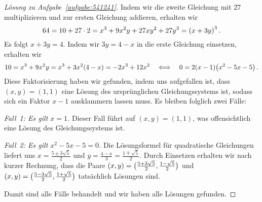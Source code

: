 \begin{proof}[Lösung zu Aufgabe~\ref{aufgabe:541241}]
	Indem wir die zweite Gleichung mit $27$ multiplizieren und zur ersten Gleichung addieren, erhalten wir
	\begin{equation*}
		64=10+27\cdot 2=x^3+9x^2y+27xy^2+27y^3=\parens*{x+3y}^3\,.
	\end{equation*}
	Es folgt $x+3y=4$. Indem wir $3y=4-x$ in die erste Gleichung einsetzen, erhalten wir
	\begin{equation*}
		10=x^3+9x^2y=x^3+3x^2(4-x)=-2x^3+12x^2\quad\Longleftrightarrow\quad 0=2(x-1)\parens*{x^2-5x-5}\,.
	\end{equation*}
	Diese Faktorisierung haben wir gefunden, indem uns aufgefallen ist, dass $(x,y)=(1,1)$ eine Lösung des ursprünglichen Gleichungssystems ist, sodass sich ein Faktor $x-1$ ausklammern lassen muss. Es bleiben folglich zwei Fälle:
	
	\emph{Fall~1: Es gilt $x=1$.} Dieser Fall führt auf $(x,y)=(1,1)$, was offensichtlich eine Lösung des Gleichungssystems ist.
	
	
	\emph{Fall~2: Es gilt $x^2-5x-5=0$.} Die Lösungsformel für quadratische Gleichungen liefert uns $x=\frac{5\pm3\sqrt{5}}{2}$ und $y=\frac{4-x}{3}=\frac{1\mp\sqrt{5}}{2}$. Durch Einsetzen erhalten wir nach kurzer Rechnung, dass die Paare $(x,y)=\parens[\big]{\frac{5+3\sqrt{5}}{2},\frac{1-\sqrt{5}}{2}}$ und $(x,y)=\parens[\big]{\frac{5-3\sqrt{5}}{2},\frac{1+\sqrt{5}}{2}}$ tatsächlich Lösungen sind.
	
	Damit sind alle Fälle behandelt und wir haben alle Lösungen gefunden.
\end{proof}

